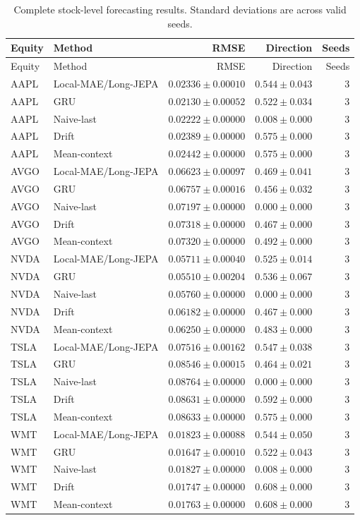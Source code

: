\begin{longtable}{llrrr}
\caption{Complete stock-level forecasting results. Standard deviations are across valid seeds.}\label{tab:appendix_stock_metrics}\\
\toprule
Equity & Method & RMSE & Direction & Seeds \\
\midrule
\endfirsthead
\toprule
Equity & Method & RMSE & Direction & Seeds \\
\midrule
\endhead
AAPL & Local-MAE/Long-JEPA & $0.02336 \pm 0.00010$ & $0.544 \pm 0.043$ & 3 \\
AAPL & GRU & $0.02130 \pm 0.00052$ & $0.522 \pm 0.034$ & 3 \\
AAPL & Naive-last & $0.02222 \pm 0.00000$ & $0.008 \pm 0.000$ & 3 \\
AAPL & Drift & $0.02389 \pm 0.00000$ & $0.575 \pm 0.000$ & 3 \\
AAPL & Mean-context & $0.02442 \pm 0.00000$ & $0.575 \pm 0.000$ & 3 \\
AVGO & Local-MAE/Long-JEPA & $0.06623 \pm 0.00097$ & $0.469 \pm 0.041$ & 3 \\
AVGO & GRU & $0.06757 \pm 0.00016$ & $0.456 \pm 0.032$ & 3 \\
AVGO & Naive-last & $0.07197 \pm 0.00000$ & $0.000 \pm 0.000$ & 3 \\
AVGO & Drift & $0.07318 \pm 0.00000$ & $0.467 \pm 0.000$ & 3 \\
AVGO & Mean-context & $0.07320 \pm 0.00000$ & $0.492 \pm 0.000$ & 3 \\
NVDA & Local-MAE/Long-JEPA & $0.05711 \pm 0.00040$ & $0.525 \pm 0.014$ & 3 \\
NVDA & GRU & $0.05510 \pm 0.00204$ & $0.536 \pm 0.067$ & 3 \\
NVDA & Naive-last & $0.05760 \pm 0.00000$ & $0.000 \pm 0.000$ & 3 \\
NVDA & Drift & $0.06182 \pm 0.00000$ & $0.467 \pm 0.000$ & 3 \\
NVDA & Mean-context & $0.06250 \pm 0.00000$ & $0.483 \pm 0.000$ & 3 \\
TSLA & Local-MAE/Long-JEPA & $0.07516 \pm 0.00162$ & $0.547 \pm 0.038$ & 3 \\
TSLA & GRU & $0.08546 \pm 0.00015$ & $0.464 \pm 0.021$ & 3 \\
TSLA & Naive-last & $0.08764 \pm 0.00000$ & $0.000 \pm 0.000$ & 3 \\
TSLA & Drift & $0.08631 \pm 0.00000$ & $0.592 \pm 0.000$ & 3 \\
TSLA & Mean-context & $0.08633 \pm 0.00000$ & $0.575 \pm 0.000$ & 3 \\
WMT & Local-MAE/Long-JEPA & $0.01823 \pm 0.00088$ & $0.544 \pm 0.050$ & 3 \\
WMT & GRU & $0.01647 \pm 0.00010$ & $0.522 \pm 0.043$ & 3 \\
WMT & Naive-last & $0.01827 \pm 0.00000$ & $0.008 \pm 0.000$ & 3 \\
WMT & Drift & $0.01747 \pm 0.00000$ & $0.608 \pm 0.000$ & 3 \\
WMT & Mean-context & $0.01763 \pm 0.00000$ & $0.608 \pm 0.000$ & 3 \\
\bottomrule
\end{longtable}
